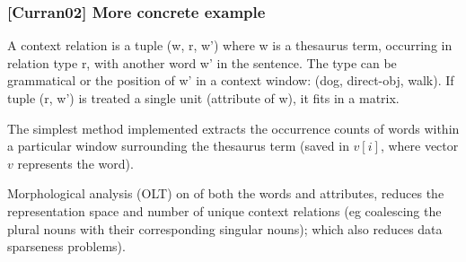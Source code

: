 \begin{frame}[plain]
	\frametitle{[Curran02] More concrete example}
	\begin{block}{}
    A context relation is a tuple (w, r, w')
    where w is a thesaurus term, occurring in relation
    type r, with another word w' in the sentence. The
    type can be grammatical or the position of w' in a
    context window: (dog, direct-obj, walk). If tuple (r, w') is
    treated a single unit (attribute of w), it fits in a matrix.
	\end{block} 
	\begin{block}{}
    The simplest method implemented extracts the
    occurrence counts of words within a particular window surrounding
    the thesaurus term (saved in $v[i]$, where vector $v$ represents
    the word).
	\end{block} 
	\begin{block}{}
    Morphological analysis (OLT) on of both the words
    and attributes, reduces the
    representation space and number of unique 
    context relations (eg coalescing the plural nouns with their
    corresponding singular nouns); which also reduces data sparseness
    problems). 
	\end{block} 
\end{frame}
